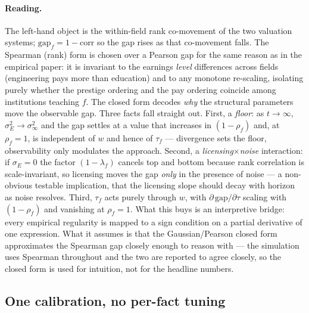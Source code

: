 \documentclass[11pt]{article}
\begin{document}
\paragraph{Reading.} The left-hand object is the within-field rank co-movement of the two valuation systems; $\mathrm{gap}_f=1-\mathrm{corr}$ so the gap rises as that co-movement falls. The Spearman (rank) form is chosen over a Pearson gap for the same reason as in the empirical paper: it is invariant to the earnings \emph{level} differences across fields (engineering pays more than education) and to any monotone re-scaling, isolating purely whether the prestige ordering and the pay ordering coincide among institutions teaching $f$. The closed form decodes \emph{why} the structural parameters move the observable gap. Three facts fall straight out. First, a \emph{floor}: as $t\to\infty$, $\sigma_E^2\to\sigma_\infty^2$ and the gap settles at a value that increases in $(1-\rho_f)$ and, at $\rho_f=1$, is independent of $w$ and hence of $\tau_f$ --- divergence sets the floor, observability only modulates the approach. Second, a \emph{licensing}$\times$\emph{noise} interaction: if $\sigma_E=0$ the factor $(1-\lambda_f)$ cancels top and bottom because rank correlation is scale-invariant, so licensing moves the gap \emph{only} in the presence of noise --- a non-obvious testable implication, that the licensing slope should decay with horizon as noise resolves. Third, $\tau_f$ acts purely through $w$, with $\partial\,\mathrm{gap}/\partial\tau$ scaling with $(1-\rho_f)$ and vanishing at $\rho_f=1$. What this buys is an interpretive bridge: every empirical regularity is mapped to a sign condition on a partial derivative of one expression. What it assumes is that the Gaussian/Pearson closed form approximates the Spearman gap closely enough to reason with --- the simulation uses Spearman throughout and the two are reported to agree closely, so the closed form is used for intuition, not for the headline numbers.

\subsection{One calibration, no per-fact tuning}
\end{document}
